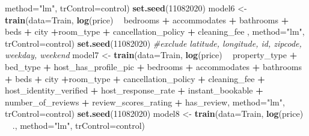 \documentclass[]{book}
\newenvironment{Shaded}{\begin{snugshade}}{\end{snugshade}}
\newcommand{\KeywordTok}[1]{\textcolor[rgb]{0.13,0.29,0.53}{\textbf{#1}}}
\newcommand{\DataTypeTok}[1]{\textcolor[rgb]{0.13,0.29,0.53}{#1}}
\newcommand{\DecValTok}[1]{\textcolor[rgb]{0.00,0.00,0.81}{#1}}
\newcommand{\StringTok}[1]{\textcolor[rgb]{0.31,0.60,0.02}{#1}}
\newcommand{\CommentTok}[1]{\textcolor[rgb]{0.56,0.35,0.01}{\textit{#1}}}
\newcommand{\OperatorTok}[1]{\textcolor[rgb]{0.81,0.36,0.00}{\textbf{#1}}}
\newcommand{\NormalTok}[1]{#1}
\begin{document}
\begin{Shaded}
\begin{Highlighting}[]
                \DataTypeTok{method=}\StringTok{"lm"}\NormalTok{, }\DataTypeTok{trControl=}\NormalTok{control)}
\KeywordTok{set.seed}\NormalTok{(}\DecValTok{11082020}\NormalTok{)}
\NormalTok{model6 <-}\StringTok{ }\KeywordTok{train}\NormalTok{(}\DataTypeTok{data=}\NormalTok{Train, }\KeywordTok{log}\NormalTok{(price) }\OperatorTok{~}\StringTok{ }\NormalTok{bedrooms }\OperatorTok{+}\StringTok{ }\NormalTok{accommodates }\OperatorTok{+}\StringTok{ }\NormalTok{bathrooms }\OperatorTok{+}\StringTok{ }\NormalTok{beds }\OperatorTok{+}\StringTok{ }
\StringTok{                  }\NormalTok{city }\OperatorTok{+}\NormalTok{room_type }\OperatorTok{+}\StringTok{ }\NormalTok{cancellation_policy }\OperatorTok{+}\StringTok{ }\NormalTok{cleaning_fee ,  }\DataTypeTok{method=}\StringTok{"lm"}\NormalTok{, }\DataTypeTok{trControl=}\NormalTok{control)}
\KeywordTok{set.seed}\NormalTok{(}\DecValTok{11082020}\NormalTok{)}
\CommentTok{#exclude latitude, longitude, id, zipcode, weekday, weekend}
\NormalTok{model7 <-}\StringTok{ }\KeywordTok{train}\NormalTok{(}\DataTypeTok{data=}\NormalTok{Train, }\KeywordTok{log}\NormalTok{(price) }\OperatorTok{~}\StringTok{ }\NormalTok{property_type }\OperatorTok{+}\StringTok{ }\NormalTok{bed_type }\OperatorTok{+}\StringTok{ }\NormalTok{host_has_profile_pic }\OperatorTok{+}\StringTok{ }
\StringTok{                  }\NormalTok{bedrooms }\OperatorTok{+}\StringTok{ }\NormalTok{accommodates }\OperatorTok{+}\StringTok{ }\NormalTok{bathrooms }\OperatorTok{+}\StringTok{ }\NormalTok{beds }\OperatorTok{+}\StringTok{ }\NormalTok{city }\OperatorTok{+}\NormalTok{room_type }\OperatorTok{+}\StringTok{ }
\StringTok{                  }\NormalTok{cancellation_policy }\OperatorTok{+}\StringTok{ }\NormalTok{cleaning_fee }\OperatorTok{+}\StringTok{ }\NormalTok{host_identity_verified }\OperatorTok{+}\StringTok{ }
\StringTok{                  }\NormalTok{host_response_rate }\OperatorTok{+}\StringTok{ }\NormalTok{instant_bookable }\OperatorTok{+}\StringTok{ }\NormalTok{number_of_reviews }\OperatorTok{+}\StringTok{ }
\StringTok{                  }\NormalTok{review_scores_rating }\OperatorTok{+}\StringTok{ }\NormalTok{has_review,  }\DataTypeTok{method=}\StringTok{"lm"}\NormalTok{, }\DataTypeTok{trControl=}\NormalTok{control)}
\KeywordTok{set.seed}\NormalTok{(}\DecValTok{11082020}\NormalTok{)}
\NormalTok{model8 <-}\StringTok{ }\KeywordTok{train}\NormalTok{(}\DataTypeTok{data=}\NormalTok{Train, }\KeywordTok{log}\NormalTok{(price) }\OperatorTok{~}\StringTok{ }\NormalTok{.,  }\DataTypeTok{method=}\StringTok{"lm"}\NormalTok{, }\DataTypeTok{trControl=}\NormalTok{control)}
\end{Highlighting}
\end{Shaded}
\end{document}
